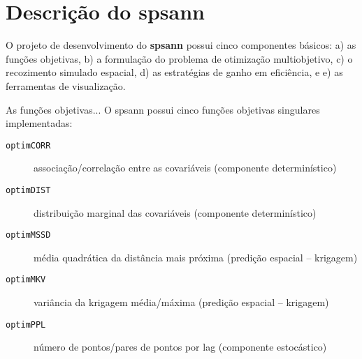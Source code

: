 \section{Descrição do \textbf{spsann}}

O projeto de desenvolvimento do \textbf{spsann} possui cinco componentes 
básicos: a) as funções objetivas, b) a formulação do problema de
otimização multiobjetivo, c) o recozimento simulado espacial, d) as
estratégias de ganho em eficiência, e e) as ferramentas de 
visualização.

As funções objetivas... 
O spsann possui cinco funções objetivas singulares implementadas:

\begin{description}
\item [\verb|optimCORR|] associação/correlação entre as covariáveis
      (componente determinístico)
\item [\verb|optimDIST|] distribuição marginal das covariáveis 
      (componente determinístico)
\item [\verb|optimMSSD|] média quadrática da distância mais próxima
      (predição espacial – krigagem)
\item [\verb|optimMKV|] variância da krigagem média/máxima (predição
      espacial – krigagem)
\item [\verb|optimPPL|] número de pontos/pares de pontos por lag 
      (componente estocástico)
\end{description}

